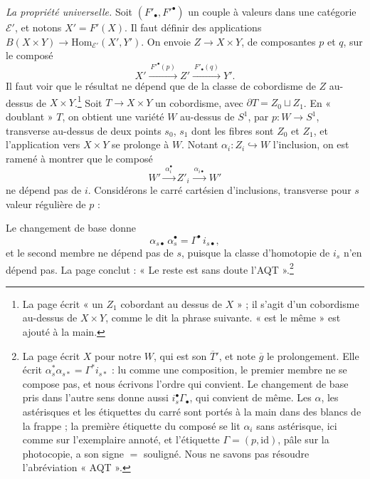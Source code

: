 \documentclass[11pt,a4paper]{article}
\begin{document}
\emph{La propriété universelle.} Soit $(F'_\bullet, F'^\bullet)$ un couple à
valeurs dans une catégorie $\mathcal{E}'$, et notons $X' = F'(X)$. Il faut
définir des applications $B(X \times Y) \to \mathrm{Hom}_{\mathcal{E}'}(X',
Y')$. On envoie $Z \to X \times Y$, de composantes $p$ et $q$, sur le composé
\[
X' \xrightarrow{\ F'^{\bullet}(p)\ } Z' \xrightarrow{\ F'_{\bullet}(q)\ } Y' .
\]
Il faut voir que le résultat ne dépend que de la classe de cobordisme de $Z$
au-dessus de $X \times Y$.\footnote{La page écrit « un $Z_1$ cobordant au
dessus de $X$ » ; il s'agit d'un cobordisme au-dessus de $X \times Y$, comme
le dit la phrase suivante. « est le même » est ajouté à la main.} Soit $T \to
X \times Y$ un cobordisme, avec $\partial T = Z_0 \sqcup Z_1$. En « doublant »
$T$, on obtient une variété $W$ au-dessus de $S^{1}$, par $p : W \to S^{1}$,
transverse au-dessus de deux points $s_0$, $s_1$ dont les fibres sont $Z_0$ et
$Z_1$, et l'application vers $X \times Y$ se prolonge à $W$. Notant $\alpha_i :
Z_i \hookrightarrow W$ l'inclusion, on est ramené à montrer que le composé
\[
W' \xrightarrow{\ \alpha_i^{\bullet}\ } Z'_i \xrightarrow{\ \alpha_{i\bullet}\ } W'
\]
ne dépend pas de $i$. Considérons le carré cartésien d'inclusions, transverse
pour $s$ valeur régulière de $p$ :


Le changement de base donne
\[
\alpha_{s\bullet}\,\alpha_s^{\bullet} = \Gamma^{\bullet}\, i_{s\bullet},
\]
et le second membre ne dépend pas de $s$, puisque la classe d'homotopie de
$i_s$ n'en dépend pas. La page conclut : « Le reste est sans doute
l'AQT ».\footnote{La page écrit $X$ pour notre $W$, qui est son
$\overline{T}'$, et note $\overline{g}$ le prolongement. Elle écrit
$\alpha_s^{*}\alpha_{s*} = \Gamma^{*} i_{s*}$ : lu comme une composition, le
premier membre ne se compose pas, et nous écrivons l'ordre qui convient. Le
changement de base pris dans l'autre sens donne aussi $i_s^{\bullet}
\Gamma_{\bullet}$, qui convient de même. Les $\alpha$, les astérisques et les
étiquettes du carré sont portés à la main dans des blancs de la frappe ; la
première étiquette du composé se lit $\alpha_i$ sans astérisque, ici comme sur
l'exemplaire annoté, et l'étiquette $\Gamma = (p, \mathrm{id})$, pâle sur la
photocopie, a son signe $=$ souligné. Nous ne savons pas résoudre
l'abréviation « AQT ».}
\end{document}
